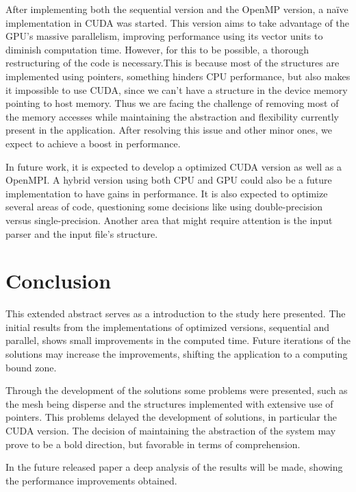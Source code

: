\documentclass[a4paper,10pt,openright,openbib,twocolumn]{article}
\begin{document}
After implementing both the sequential version and the OpenMP version, a na\"{i}ve implementation in CUDA was started. This version aims to take advantage of the GPU's massive parallelism, improving performance using its vector units to diminish computation time. However, for this to be possible, a thorough restructuring of the code is necessary.This is because most of the structures are implemented using pointers, something hinders CPU performance, but also makes it impossible to use CUDA, since we can't have a structure in the device memory pointing to host memory. Thus we are facing the challenge of removing most of the memory accesses while maintaining the abstraction and flexibility currently present in the application. After resolving this issue and other minor ones, we expect to achieve a boost in performance.

In future work, it is expected to develop a optimized CUDA version as well as a OpenMPI. A hybrid version using both CPU and GPU could also be a future implementation to have gains in performance. It is also expected to optimize several areas of code, questioning some decisions like using double-precision versus single-precision. Another area that might require attention is the input parser and the input file's structure. 

\section{Conclusion}

This extended abstract serves as a introduction to the study here presented. The initial results from the implementations of optimized versions, sequential and parallel, shows small improvements in the computed time. Future iterations of the solutions may increase the improvements, shifting the application to a computing bound zone.

Through the development of the solutions some problems were presented, such as the mesh being disperse and the structures implemented with extensive use of pointers. This problems delayed the development of solutions, in particular the CUDA version. The decision of maintaining the abstraction of the system may prove to be a bold direction, but favorable in terms of comprehension.

In the future released paper a deep analysis of the results will be made, showing the performance improvements obtained.
\end{document}
